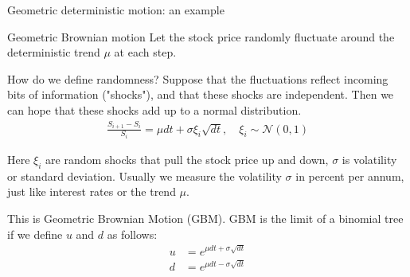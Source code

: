 \documentclass{beamer}
\begin{document}
\begin{frame}{Geometric deterministic motion: an example}
\centering
{}
\end{frame}



\begin{frame}{Geometric Brownian motion}
\justify
Let the stock price randomly fluctuate  around the deterministic trend $\mu$ at each step.

\justify
How do we define randomness? Suppose that the fluctuations reflect incoming bits of information ("shocks"), and that these shocks are independent. Then we can hope that these shocks add up to a normal distribution.
 \begin{align*}
\frac{S_{i+1} - S_i}{S_i} = \mu dt + \sigma\xi_i\sqrt{dt}, \quad \xi_i \sim \mathcal{N}(0, 1)
\end{align*}

Here $\xi_i$ are random shocks that pull the stock price up and down, $\sigma$ is volatility or standard deviation. Usually we measure the volatility $\sigma$ in percent per annum, just like interest rates or the trend $\mu$.

\justify
This is Geometric Brownian Motion (GBM). GBM is the limit of a binomial tree if we define $u$ and $d$ as follows:
\begin{align*}
u &= e^{\mu dt + \sigma\sqrt{dt}} \\
d &= e^{\mu dt - \sigma\sqrt{dt}}
\end{align*}
\end{frame}



\newcommand{\plotBrownianMotion}[2] {
	
	\addplot[
		color = #2,
		mark = none,
		thick
	]
	table[
		x=t,
		y=s,
		col sep=comma
	]
	{#1};
	
	\addplot[
		color = #2,
		mark = none,
		thick,
		dashed,
		forget plot
	] 
	table[
		x=t,
		y=trend,
		col sep=comma
	]
	{#1};
}
\end{document}
